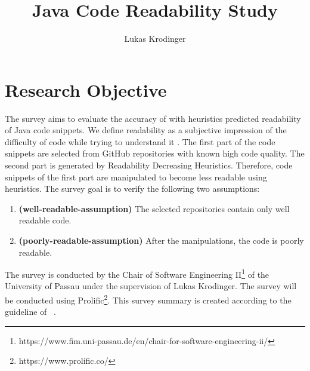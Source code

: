 \documentclass[%
class=scrreprt,
chapterprefix=false,%
open=right,%
twoside=false,%
paper=a4,%
logofile={Logo\_zentral\_farbig\_EN.png},%
thesistype=masterproposal,%
UKenglish,%
]{se2thesis}
\author{Lukas Krodinger}
\title{Java Code Readability Study}
\institute{Chair of Software Engineering II}
\begin{document}
	
	\frontmatter
	
	\maketitle
	
	\mainmatter
	
\section{Research Objective}
The survey aims to evaluate the accuracy of with heuristics predicted readability of Java code snippets. 
We define readability as a subjective impression of the difficulty of code while trying to understand it \cite{posnett2011simpler, buse2009learning}.
The first part of the code snippets are selected from GitHub repositories with known high code quality.
The second part is generated by Readability Decreasing Heuristics. Therefore, code snippets of the first part are manipulated to become less readable using heuristics.
The survey goal is to verify the following two assumptions:
\begin{enumerate}
	\item \label{well-readable-assumption} \textbf{(well-readable-assumption)} The selected repositories contain only well readable code.
	\item \label{poorly-readable-assumption} \textbf{(poorly-readable-assumption)} After the manipulations, the code is poorly readable.
\end{enumerate}

The survey is conducted by the Chair of Software Engineering II\footnote{https://www.fim.uni-passau.de/en/chair-for-software-engineering-ii/} of the University of Passau under the supervision of Lukas Krodinger.
The survey will be conducted using Prolific\footnote{https://www.prolific.co/}. This survey summary is created according to the guideline of \citeauthor{linaker2015guidelines}~\cite{linaker2015guidelines}.
\end{document}
